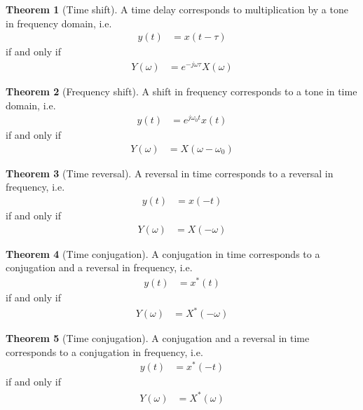 \documentclass[titlepage, fleqn, a4paper, 12pt, twoside]{article}
\theoremstyle{definition}
\theoremstyle{theorem}
\newtheorem{theorem}{Theorem}
\begin{document}
\begin{theorem}[Time shift]
	A time delay corresponds to multiplication by a tone in frequency domain, i.e.
	\begin{align*}
		y(t) &= x(t - \tau)
	\end{align*}
	if and only if
	\begin{align*}
		Y(\omega) &= e^{-j \omega \tau} X(\omega)
	\end{align*}
	\label{thm:time_shift}
\end{theorem}

\begin{theorem}[Frequency shift]
	A shift in frequency corresponds to a tone in time domain, i.e.
	\begin{align*}
		y(t) &= e^{j \omega_0 t} x(t)
	\end{align*}
	if and only if
	\begin{align*}
		Y(\omega) &= X(\omega - \omega_0)
	\end{align*}
	\label{thm:frequency_shift}
\end{theorem}

\begin{theorem}[Time reversal]
	A reversal in time corresponds to a reversal in frequency, i.e.
	\begin{align*}
		y(t) &= x(-t)
	\end{align*}
	if and only if
	\begin{align*}
		Y(\omega) &= X(-\omega)
	\end{align*}
	\label{thm:time_reversal}
\end{theorem}

\begin{theorem}[Time conjugation]
	A conjugation in time corresponds to a conjugation and a reversal in frequency, i.e.
	\begin{align*}
		y(t) &= x^*(t)
	\end{align*}
	if and only if
	\begin{align*}
		Y(\omega) &= X^*(-\omega)
	\end{align*}
	\label{thm:time_conjugation}
\end{theorem}

\begin{theorem}[Time conjugation]
	A conjugation and a reversal in time corresponds to a conjugation in frequency, i.e.
	\begin{align*}
		y(t) &= x^*(-t)
	\end{align*}
	if and only if
	\begin{align*}
		Y(\omega) &= X^*(\omega)
	\end{align*}
	\label{thm:time_conjugation}
\end{theorem}
\end{document}
